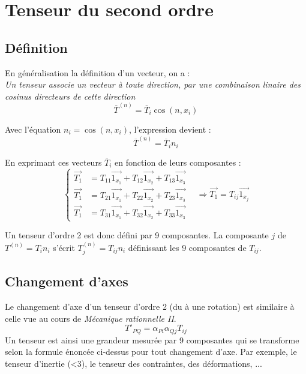 \section{Tenseur du second ordre}
    \subsection{Définition}
    En généralisation la définition d'un vecteur, on a : \\
    \textit{Un tenseur associe un vecteur à toute direction, par une combinaison linaire des cosinus
    directeurs de cette direction}
    \begin{equation}
    \overline{T}^{(n)} = \overline{T}_i\cos(n,x_i)
    \end{equation}
    
    Avec l'équation $n_i = \cos(n,x_i)$, l'expression devient :
    \begin{equation}
    \overline{T}^{(n)} = \overline{T}_in_i
    \end{equation}
    
    En exprimant ces vecteurs $\overline{T}_i$ en fonction de leurs composantes :
    \begin{equation}
    \left\{\begin{array}{ll}
     \vec{T_1}&= T_{11} \vec{1_{x_1}}+T_{12} \vec{1_{x_2}}+T_{13} \vec{1_{x_3}}  \\
     \vec{T_1}&= T_{21} \vec{1_{x_1}}+T_{22} \vec{1_{x_2}}+T_{23} \vec{1_{x_3}}  \\
     \vec{T_1}&= T_{31} \vec{1_{x_1}}+T_{32} \vec{1_{x_2}}+T_{33} \vec{1_{x_3}}  
    \end{array}\right.\ \ \ \ \Rightarrow \vec{T_1} = T_{ij}\vec{1_{x_j}}
    \end{equation}

    Un tenseur d'ordre 2 est donc défini par 9 composantes. La composante $j$ de $T^{(n)} =
    T_in_i$ s'écrit $T^{(n)}_j = T_{ij}n_i$ définissant les 9 composantes de $T_{ij}$.
    
    
    \subsection{Changement d'axes}
    Le changement d'axe d'un tenseur d'ordre 2 (du à une rotation) est similaire à celle vue au cours
    de \textit{Mécanique rationnelle II}.
    \begin{equation}
    T'_{PQ} = \alpha_{Pi}\alpha_{Qj}T_{ij}
    \end{equation}
    Un tenseur est ainsi une grandeur mesurée par 9 composantes qui se transforme selon la formule
    énoncée ci-dessus pour tout changement d'axe. Par exemple, le tenseur d'inertie (<3), le tenseur
    des contraintes, des déformations, ...


